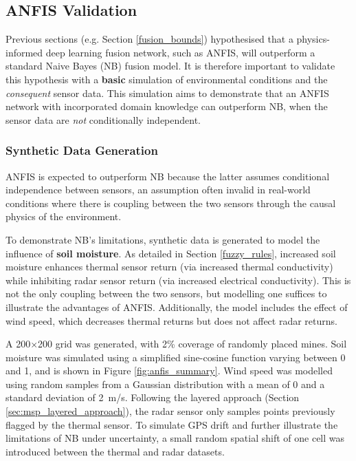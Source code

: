 \subsection{ANFIS Validation} \label{compvis_anfisvalid}

Previous sections (e.g. Section \ref{fusion_bounds}) hypothesised that a physics-informed deep learning fusion network, such as ANFIS, will outperform a standard Naive Bayes (NB) fusion model. It is therefore important to validate this hypothesis with a \textbf{basic} simulation of environmental conditions and the \textit{consequent} sensor data. This simulation aims to demonstrate that an ANFIS network with incorporated domain knowledge can outperform NB, when the sensor data are \textit{not} conditionally independent.

\subsubsection{Synthetic Data Generation}  

    ANFIS is expected to outperform NB because the latter assumes conditional independence between sensors, an assumption often invalid in real-world conditions where there is coupling between the two sensors through the causal physics of the environment. 
    
    To demonstrate NB's limitations, synthetic data is generated to model the influence of \textbf{soil moisture}. As detailed in Section \ref{fuzzy_rules}, increased soil moisture enhances thermal sensor return (via increased thermal conductivity) while inhibiting radar sensor return (via increased electrical conductivity). This is not the only coupling between the two sensors, but modelling one suffices to illustrate the advantages of ANFIS. Additionally, the model includes the effect of wind speed, which decreases thermal returns but does not affect radar returns.


    A 200$\times$200 grid was generated, with 2\% coverage of randomly placed mines. Soil moisture was simulated using a simplified sine-cosine function varying between 0 and 1, and is shown in Figure \ref{fig:anfis_summary}. Wind speed was modelled using random samples from a Gaussian distribution with a mean of 0 and a standard deviation of 2~m/s. Following the layered approach (Section \ref{sec:msp_layered_approach}), the radar sensor only samples points previously flagged by the thermal sensor. To simulate GPS drift and further illustrate the limitations of NB under uncertainty, a small random spatial shift of one cell was introduced between the thermal and radar datasets.


